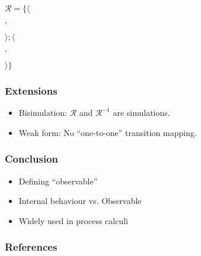 \documentclass{beamer}
\begin{document}
\begin{frame}
	$\mathcal{R} = \{\langle$
			 $, $
		$\rangle;\langle$
			 $, $
		$\rangle\}$
\end{frame}


\begin{frame}
	\frametitle{Extensions}
	\begin{itemize}
		\item Bisimulation: $\mathcal{R}$ and $\mathcal{R}^{-1}$ are simulations.
		\item Weak form: No ``one-to-one'' transition mapping.
	\end{itemize}
\end{frame}

\begin{frame}
	\frametitle{Conclusion}
	\begin{itemize}
		\item Defining ``observable''
		\item Internal behaviour vs. Observable
		\item Widely used in process calculi
	\end{itemize}
\end{frame}

\begin{frame}
	\frametitle{References}
	\nocite{*}
	
	 
\end{frame}
\end{document}
